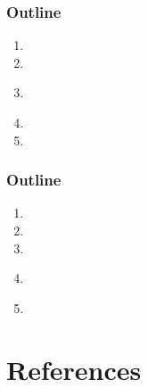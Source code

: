 \documentclass[usenames,dvipsnames]{beamer}
\begin{document}


\miniframesoff
  \begin{frame}
    \frametitle{\textbf{ Outline}}
  \begin{enumerate}
    \item \introtitle
    \item \firsttitle
    \item \textbf{\secondtitle}
    \item \thirdtitle
    \item \conclusiontitle
  \end{enumerate}
  \end{frame}
\miniframeson



\miniframesoff
  \begin{frame}
    \frametitle{\textbf{ Outline}}
  \begin{enumerate}
    \item \introtitle
    \item \firsttitle
    \item \secondtitle
    \item \textbf{\thirdtitle}
    \item \conclusiontitle
  \end{enumerate}
  \end{frame}
\miniframeson


  

\hypertarget{references}{%
\section{References}\label{references}}
\end{document}
